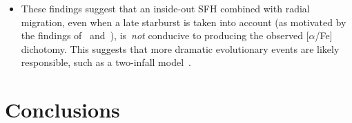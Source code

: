 \documentclass[a4paper, fleqn, usenatbib, useAMS]{mnras}
\begin{document}
\begin{itemize}
	\item These findings suggest that an inside-out SFH combined with radial 
	migration, even when a late starburst is taken into account (as motivated 
	by the findings of~\citealp{Isern2019} and~\citealp{Mor2019}), 
	is~\textit{not} conducive to producing the observed [$\alpha$/Fe] 
	dichotomy. This suggests that more dramatic evolutionary events are likely 
	responsible, such as a two-infall model~\citep[e.g.][]{Chiappini1997, 
	Chiappini2001, Romano2010, Grisoni2017, Noguchi2018, Spitoni2009, 
	Spitoni2016, Spitoni2018, Spitoni2019, Spitoni2020}. 
\end{itemize} 

\section{Conclusions} 
\label{sec:conclusions} 
\end{document}

